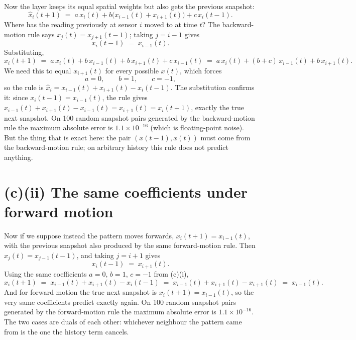 \documentclass[11pt,letterpaper]{article}
\begin{document}
Now the layer keeps its equal spatial weights but also gets the previous snapshot:
\begin{equation*}
\hat{x}_i(t+1) \;=\; a\, x_i(t) + b\bigl(x_{i-1}(t) + x_{i+1}(t)\bigr) + c\, x_i(t-1).
\end{equation*}
Where has the reading previously at sensor $i$ moved to at time $t$? The backward-motion rule
says $x_j(t) = x_{j+1}(t-1)$; taking $j = i - 1$ gives
\begin{equation*}
x_i(t-1) \;=\; x_{i-1}(t).
\end{equation*}
Substituting,
\begin{equation*}
\hat{x}_i(t+1)
\;=\; a\, x_i(t) + b\, x_{i-1}(t) + b\, x_{i+1}(t) + c\, x_{i-1}(t)
\;=\; a\, x_i(t) + (b + c)\, x_{i-1}(t) + b\, x_{i+1}(t).
\end{equation*}
We need this to equal $x_{i+1}(t)$ for every possible $x(t)$, which forces
\begin{equation*}
\boxed{a = 0, \qquad b = 1, \qquad c = -1,}
\end{equation*}
so the rule is $\hat{x}_i = x_{i-1}(t) + x_{i+1}(t) - x_i(t-1)$. The substitution confirms it:
since $x_i(t-1) = x_{i-1}(t)$, the rule gives $x_{i-1}(t) + x_{i+1}(t) - x_{i-1}(t) =
x_{i+1}(t) = x_i(t+1)$, exactly the true next snapshot. On 100 random snapshot pairs generated
by the backward-motion rule the maximum absolute error is $1.1 \times 10^{-16}$ (which is
floating-point noise). But the thing that is exact here: the pair $(x(t-1), x(t))$ must come from the
backward-motion rule; on arbitrary history this rule does not predict anything.

\section*{(c)(ii) The same coefficients under forward motion}

Now if we suppose instead the pattern moves forwards, $x_i(t+1) = x_{i-1}(t)$, with the previous snapshot
also produced by the same forward-motion rule. Then $x_j(t) = x_{j-1}(t-1)$, and taking
$j = i + 1$ gives
\begin{equation*}
x_i(t-1) \;=\; x_{i+1}(t).
\end{equation*}
Using the same coefficients $a = 0$, $b = 1$, $c = -1$ from (c)(i),
\begin{equation*}
\hat{x}_i(t+1)
\;=\; x_{i-1}(t) + x_{i+1}(t) - x_i(t-1)
\;=\; x_{i-1}(t) + x_{i+1}(t) - x_{i+1}(t)
\;=\; x_{i-1}(t).
\end{equation*}
And for forward motion the true next snapshot is $x_i(t+1) = x_{i-1}(t)$, so the very same
coefficients predict exactly again. On 100 random snapshot pairs generated by the forward-motion
rule the maximum absolute error is $1.1 \times 10^{-16}$. The two cases are duals of each
other: whichever neighbour the pattern came from is the one the history term cancels.
\end{document}
